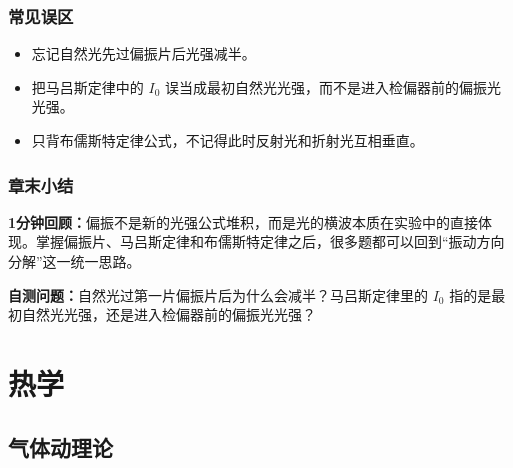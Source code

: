 \documentclass[lang=cn,11pt]{elegantbook}
\newcommand{\summaryline}[1]{\par\noindent\textbf{1分钟回顾：}#1\par}
\newcommand{\chapterselfcheck}[1]{\par\noindent\textbf{自测问题：}#1\par}
\begin{document}
\section{常见误区}

\begin{itemize}
 \item 忘记自然光先过偏振片后光强减半。
 \item 把马吕斯定律中的 \(I_0\) 误当成最初自然光光强，而不是进入检偏器前的偏振光光强。
 \item 只背布儒斯特定律公式，不记得此时反射光和折射光互相垂直。
\end{itemize}

\section{章末小结}

\summaryline{偏振不是新的光强公式堆积，而是光的横波本质在实验中的直接体现。掌握偏振片、马吕斯定律和布儒斯特定律之后，很多题都可以回到“振动方向分解”这一统一思路。}
\chapterselfcheck{自然光过第一片偏振片后为什么会减半？马吕斯定律里的 \(I_0\) 指的是最初自然光光强，还是进入检偏器前的偏振光光强？}

\part{热学}

\chapter{气体动理论}
\end{document}
